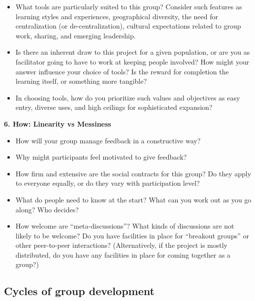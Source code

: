 \begin{itemize}
\tightlist
\item
  What tools are particularly suited to this group? Consider such
  features as learning styles and experiences, geographical diversity,
  the need for centralization (or de-centralization), cultural
  expectations related to group work, sharing, and emerging leadership.
\item
  Is there an inherent draw to this project for a given population, or
  are you as facilitator going to have to work at keeping people
  involved? How might your answer influence your choice of tools? Is the
  reward for completion the learning itself, or something more tangible?
\item
  In choosing tools, how do you prioritize such values and objectives as
  easy entry, diverse uses, and high ceilings for sophisticated
  expansion?
\end{itemize}

\textbf{6. How: Linearity vs Messiness}

\begin{itemize}
\tightlist
\item
  How will your group manage feedback in a constructive way?
\item
  Why might participants feel motivated to give feedback?
\item
  How firm and extensive are the social contracts for this group? Do
  they apply to everyone equally, or do they vary with participation
  level?
\item
  What do people need to know at the start? What can you work out as you
  go along? Who decides?
\item
  How welcome are ``meta-discussions''? What kinds of discussions are
  not likely to be welcome? Do you have facilities in place for
  ``breakout groups'' or other peer-to-peer interactions?
  (Alternatively, if the project is mostly distributed, do you have any
  facilities in place for coming together as a group?)
\end{itemize}

\hypertarget{cycles-of-group-development}{%
\subsection{Cycles of group
development}\label{cycles-of-group-development}}

